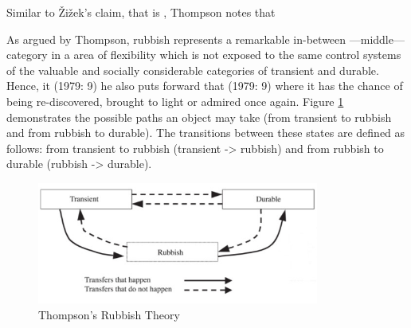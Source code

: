 Similar to Žižek’s claim, that is , Thompson notes that 

As argued by Thompson, rubbish represents a remarkable in-between ---middle--- category in a area of flexibility which is not exposed to the same control systems of the valuable and socially considerable categories of transient and durable. Hence, it  (1979: 9) he also puts forward that  (1979: 9) where it has the chance of being re-discovered, brought to light or admired once again. Figure \ref{fig:rubbish_theory} demonstrates the possible paths an object may take (from transient to rubbish and from rubbish to durable). The transitions between these states are defined as follows: from transient to rubbish (transient -> rubbish) and from rubbish to durable (rubbish -> durable).

\begin{figure}[h!]
  \centering
  \includegraphics[height=4cm]{graphics/rubbish_theory.jpg}
  \caption{Thompson’s Rubbish Theory}
  \label{fig:rubbish_theory}
\end{figure}

